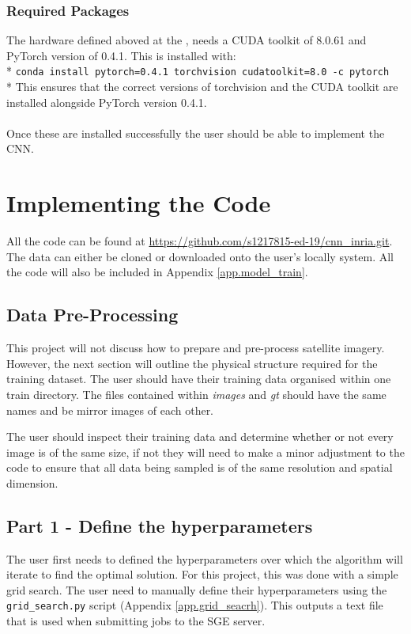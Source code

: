 \subsubsection{Required Packages}
The hardware defined aboved at the \citet{ecdf19}, needs a CUDA toolkit of 8.0.61 and PyTorch version of 0.4.1. This is installed with: \medskip \\* \texttt{conda install  pytorch=0.4.1 torchvision cudatoolkit=8.0 -c pytorch }  \medskip \\*
This ensures that the correct versions of torchvision and the CUDA toolkit are installed alongside PyTorch version 0.4.1. 

\paragraph{}
Once these are installed successfully the user should be able to implement the CNN. 

\section{Implementing the Code}
All the code can be found at \url{https://github.com/s1217815-ed-19/cnn_inria.git}. The data can either be cloned or downloaded onto the user's locally system. All the code will also be included in Appendix \ref{app.model_train}.
\subsection*{Data Pre-Processing}
This project will not discuss how to prepare and pre-process satellite imagery. However, the next section will outline the physical structure required for the training dataset.
The user should have their training data organised within one train directory. 
The files contained within \textit{images} and \textit{gt} should have the same names and be mirror images of each other. 
\par
The user should inspect their training data and determine whether or not every image is of the same size, if not they will need to make a minor adjustment to the code to ensure that all data being sampled is of the same resolution and spatial dimension.
\subsection*{Part 1 - Define the hyperparameters}
The user first needs to defined the hyperparameters over which the algorithm will iterate to find the optimal solution. For this project, this was done with a simple grid search. The user need to manually define their hyperparameters using the \texttt{grid\_search.py} script (Appendix \ref{app.grid_seacrh}). This outputs a text file that is used when submitting jobs to the SGE server. 

